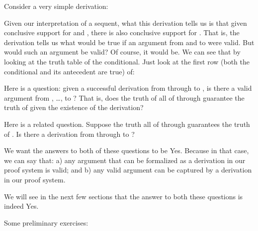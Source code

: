 Consider a very simple derivation:

\begin{argument*}
 



\end{argument*}

Given our interpretation of a sequent, what this derivation tells us is that 
given conclusive support for  and , there is also conclusive 
support for . That is, the derivation tells us what would be true if an 
argument from  and  to  were valid. But would such an 
argument be valid? Of course, it would be.  We can see that by looking at the 
truth table of the conditional.  Just look at the first row (both the 
conditional and its antecedent are true) of:

\begin{center}

 

\end{center}


Here is a question: given a successful derivation from  through  to ,
 is there a valid argument from , \ldots,  to ?  That is, 
 does the truth of all of  through  guarantee the truth of  
 given the existence of the derivation?

Here is a related question. Suppose the truth all of  through  
guarantees the truth of . Is there a derivation from  through  to ?

We want the answers to both of these questions to be Yes. Because in that case, 
we can say that: a) any argument that can be formalized as a derivation in our 
proof system is valid; and b) any valid argument can be captured by a derivation 
in our proof system. 

We will see in the next few sections that the answer to both these questions is 
indeed Yes.

Some preliminary exercises:

